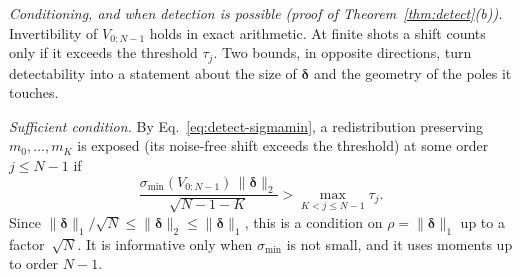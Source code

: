 \documentclass[submission, PhysCore]{SciPost}
\begin{document}
\begin{appendix}
\emph{Conditioning, and when detection is possible (proof of Theorem~\ref{thm:detect}(b)).} Invertibility of $V_{0:N-1}$ holds in exact arithmetic. At finite shots a shift counts only if it exceeds the threshold $\tau_j$. Two bounds, in opposite directions, turn detectability into a statement about the size of $\bm{\delta}$ and the geometry of the poles it touches.

\emph{Sufficient condition.} By Eq.~\eqref{eq:detect-sigmamin}, a redistribution preserving $m_0,\dots,m_K$ is exposed (its noise-free shift exceeds the threshold) at some order $j\le N-1$ if
\[
\frac{\sigma_{\min}(V_{0:N-1})\,\|\bm{\delta}\|_2}{\sqrt{N-1-K}}>\max_{K<j\le N-1}\tau_j .
\]
Since $\|\bm{\delta}\|_1/\sqrt{N}\le\|\bm{\delta}\|_2\le\|\bm{\delta}\|_1$, this is a condition on $\rho=\|\bm{\delta}\|_1$ up to a factor~$\sqrt{N}$. It is informative only when $\sigma_{\min}$ is not small, and it uses moments up to order $N-1$.


\end{appendix}
\end{document}
